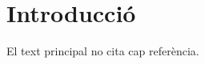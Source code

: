 \documentclass[
  CAT,MEM,no-cover,no-toc,
  bibliography={fixtures/pxBibliography.references},
  bibliography-all=false
]{P3CTeX}
\begin{document}
\tableofcontents
\chapter{Introducció}
El text principal no cita cap referència.
\end{document}
